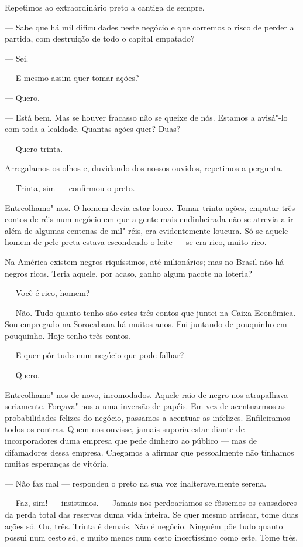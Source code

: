 Repetimos ao extraordinário preto a cantiga de sempre.

--- Sabe que há mil dificuldades neste negócio e que corremos o risco de
perder a partida, com destruição de todo o capital empatado?

--- Sei.

--- E mesmo assim quer tomar ações?

--- Quero.

--- Está bem. Mas se houver fracasso não se queixe de nós. Estamos a
avisá"-lo com toda a lealdade. Quantas ações quer? Duas?

--- Quero trinta.

Arregalamos os olhos e, duvidando dos nossos ouvidos, repetimos a
pergunta.

--- Trinta, sim --- confirmou o preto.

Entreolhamo"-nos. O homem devia estar louco. Tomar trinta ações, empatar
três contos de réis num negócio em que a gente mais endinheirada não se
atrevia a ir além de algumas centenas de mil"-réis, era evidentemente
loucura. Só se aquele homem de pele preta estava escondendo o leite ---
se era rico, muito rico.

Na América existem negros riquíssimos, até milionários; mas no Brasil
não há negros ricos. Teria aquele, por acaso, ganho algum pacote na
loteria?

--- Você é rico, homem?

--- Não. Tudo quanto tenho são estes três contos que juntei na Caixa
Econômica. Sou empregado na Sorocabana há muitos anos. Fui juntando de
pouquinho em pouquinho. Hoje tenho três contos.

--- E quer pôr tudo num negócio que pode falhar?

--- Quero.

Entreolhamo"-nos de novo, incomodados. Aquele raio de negro nos
atrapalhava seriamente. Forçava"-nos a uma inversão de papéis. Em vez de
acentuarmos as probabilidades felizes do negócio, passamos a acentuar as
infelizes. Enfileiramos todos os contras. Quem nos ouvisse, jamais
suporia estar diante de incorporadores duma empresa que pede dinheiro ao
público --- mas de difamadores dessa empresa. Chegamos a afirmar que
pessoalmente não tínhamos muitas esperanças de vitória.

--- Não faz mal --- respondeu o preto na sua voz inalteravelmente
serena.

--- Faz, sim! --- insistimos. --- Jamais nos perdoaríamos se fôssemos os
causadores da perda total das reservas duma vida inteira. Se quer mesmo
arriscar, tome duas ações só. Ou, três. Trinta é demais. Não é negócio.
Ninguém põe tudo quanto possui num cesto só, e muito menos num cesto
incertíssimo como este. Tome três.

